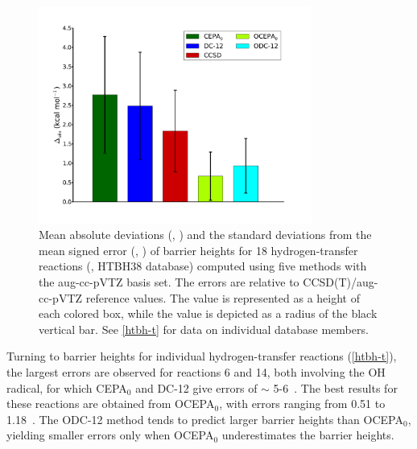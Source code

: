 \begin{figure}[hb!]
	\centering
	\caption{%
        \label{htbh-f}
        Mean absolute deviations (\mae, \kcal) and the standard deviations from
        the mean signed error (\std, \kcal) of barrier heights for 18
        hydrogen-transfer reactions (,
        HTBH38 database) computed using five methods with the aug-cc-pVTZ basis
        set.
        The errors are relative to CCSD(T)/aug-cc-pVTZ reference values.
        The \mae value is represented as a height of each colored box, while the
        \std value is depicted as a radius of the black vertical bar.
        See \cref{htbh-t} for data on individual database members.
	}
	\includegraphics[width=0.8\textwidth]{figures/htbh.pdf}
\end{figure}

Turning to barrier heights for individual hydrogen-transfer reactions
(\cref{htbh-t}), the largest errors are observed for reactions 6 and 14, both
involving the OH radical, for which CEPA$_0$ and DC-12 give errors of $\sim$
5-6~\kcal.
The best results for these reactions are obtained from OCEPA$_0$, with errors
ranging from 0.51 to 1.18~\kcal.
The ODC-12 method tends to predict larger barrier heights than OCEPA$_0$,
yielding smaller errors only when OCEPA$_0$ underestimates the barrier heights.

